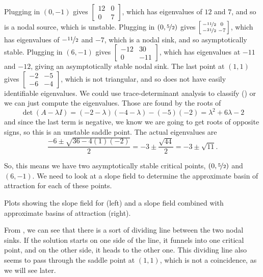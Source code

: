 \begin{exampleSol}
Plugging in $(0,-1)$ gives $\left[ \begin{smallmatrix} 12 & 0 \\ 0 & 7 \end{smallmatrix} \right]$, which has eigenvalues of $12$ and $7$, and so is a nodal source, which is unstable. Plugging in  $\left(0, \nicefrac{5}{2}\right)$ gives $\left[ \begin{smallmatrix} -\nicefrac{11}{2} & 0 \\ -\nicefrac{21}{2} & -7 \end{smallmatrix} \right]$, which has eigenvalues of $-\nicefrac{11}{2}$ and $-7$, which is a nodal sink, and so asymptotically stable. Plugging in $(6,-1)$ gives $\left[ \begin{smallmatrix} -12 & 30 \\ 0 & -11 \end{smallmatrix} \right]$, which has eigenvalues at $-11$ and $-12$, giving an asymptotically stable nodal sink. The last point at $(1,1)$ gives $\left[ \begin{smallmatrix} -2 & -5 \\ -6 & -4 \end{smallmatrix} \right]$, which is not triangular, and so does not have easily identifiable eigenvalues. We could use trace-determinant analysis to classify () or we can just compute the eigenvalues. Those are found by the roots of
\begin{equation*}
\det(A - \lambda I) = (-2-\lambda)(-4-\lambda) - (-5)(-2) = \lambda^2 + 6\lambda - 2
\end{equation*}
and since the last term is negative, we know we are going to get roots of opposite signs, so this is an unstable saddle point. The actual eigenvalues are
\begin{equation*}
\frac{-6 \pm \sqrt{36 - 4(1)(-2)}}{2} = -3 \pm \frac{\sqrt{44}}{2} = -3\pm\sqrt{11}.
\end{equation*}

So, this means we have two asymptotically stable critical points, $\left(0, \nicefrac{5}{2}\right)$ and $(6, -1)$. We need to look at a slope field to determine the approximate basin of attraction for each of these points.

\begin{myfig}
\capstart
{}
\caption{Plots showing the slope field for  (left) and a slope field combined with approximate basins of attraction (right). \label{fig:BoAPlot}}
\end{myfig}

From , we can see that there is a sort of dividing line between the two nodal sinks. If the solution starts on one side of the line, it funnels into one critical point, and on the other side, it heads to the other one. This dividing line also seems to pass through the saddle point at $(1,1)$, which is not a coincidence, as we will see later. 
\end{exampleSol}

